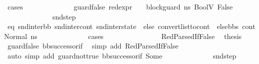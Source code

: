 \begin{isabellebody}
\ cases\isanewline
\ \ \ \ \ \ \ \ \ \ \ \ \isamarkupfalse%
\ guard{\isacharunderscore}{\kern0pt}false{\isacharcolon}{\kern0pt}\ {\isachardoublequoteopen}{\isacharparenleft}{\kern0pt}red{\isacharunderscore}{\kern0pt}expr\ {\isasymLambda}\ {\isasymGamma}\ {\isasymOmega}\ block{\isacharunderscore}{\kern0pt}guard\ ns{}\ {\isacharparenleft}{\kern0pt}BoolV\ False{\isacharparenright}{\kern0pt}{\isacharparenright}{\kern0pt}{\isachardoublequoteclose}\isanewline
\ \ \ \ \ \ \ \ \ \ \ \ \isamarkupfalse%
\ snd{\isacharunderscore}{\kern0pt}step\ \isamarkupfalse%
\ eq{\isacharcolon}{\kern0pt}\ {\isachardoublequoteopen}{\isacharparenleft}{\kern0pt}snd{\isacharunderscore}{\kern0pt}inter{\isacharunderscore}{\kern0pt}bb{\isacharcomma}{\kern0pt}\ snd{\isacharunderscore}{\kern0pt}inter{\isacharunderscore}{\kern0pt}cont{\isacharcomma}{\kern0pt}\ snd{\isacharunderscore}{\kern0pt}inter{\isacharunderscore}{\kern0pt}state{\isacharparenright}{\kern0pt}\ {\isacharequal}{\kern0pt}\ {\isacharparenleft}{\kern0pt}else{}{\isacharcomma}{\kern0pt}\ convert{\isacharunderscore}{\kern0pt}list{\isacharunderscore}{\kern0pt}to{\isacharunderscore}{\kern0pt}cont\ {\isacharparenleft}{\kern0pt}\ else{\isacharunderscore}{\kern0pt}bbs{\isacharparenright}{\kern0pt}\ cont{}{\isacharcomma}{\kern0pt}\ Normal\ ns{}{\isacharparenright}{\kern0pt}{\isachardoublequoteclose}\isanewline
\ \ \ \ \ \ \ \ \ \ \ \ \isamarkupfalse%
\ cases\isanewline
\ \ \ \ \ \ \ \ \ \ \ \ \ \ \isamarkupfalse%
\ RedParsedIfFalse\ \isamarkupfalse%
\ {\isacharquery}{\kern0pt}thesis\ \isamarkupfalse%
\ guard{\isacharunderscore}{\kern0pt}false\ bb{\isacharunderscore}{\kern0pt}successor{\isacharunderscore}{\kern0pt}if\ \isamarkupfalse%
\ {\isacharparenleft}{\kern0pt}simp\ add{\isacharcolon}{\kern0pt}\ RedParsedIfFalse{\isacharparenright}{\kern0pt}\isanewline
\ \ \ \ \ \ \ \ \ \ \ \ \isamarkupfalse%
\ {\isacharparenleft}{\kern0pt}auto\ simp\ add{\isacharcolon}{\kern0pt}\ guard{\isacharunderscore}{\kern0pt}not{\isacharunderscore}{\kern0pt}true\ bb{\isacharunderscore}{\kern0pt}successor{\isacharunderscore}{\kern0pt}if\ Some{\isacharparenright}{\kern0pt}\isanewline
\isanewline
\ \ \ \ \ \ \ \ \ \ \ \ \isamarkupfalse%
\ snd{\isacharunderscore}{\kern0pt}step\ \isanewline
\ \ \ \ \ \ \ \ \ \ \ \ \isamarkupfalse%

\end{isabellebody}
